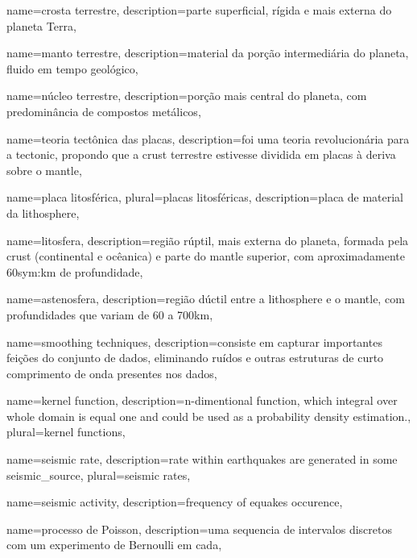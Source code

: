 {
	name={crosta terrestre},
	description={parte superficial, rígida e mais externa do planeta Terra},
}

{
	name={manto terrestre},
	description={material da por{ç}{ã}o intermediária do planeta, 
		fluido em tempo geológico},
}

{
	name={n{ú}cleo terrestre},
	description={por{ç}{ã}o mais central do planeta, com predomin{â}ncia de compostos metálicos},
}

{
	name={teoria tect{ô}nica das placas},
	description={foi uma teoria revolucionária para a \gls{tectonic},
				propondo que a \gls{crust} terrestre estivesse dividida 
				em placas {à} deriva sobre o \gls{mantle}},
}


{
	name={placa litosf{é}rica},
	plural={placas litosf{é}ricas},
	description={placa de material da \gls{lithosphere}},
}


{
	name={litosfera},
	description={região rúptil, mais externa do planeta, formada pela \gls{crust} 
		(continental e ocêanica) e parte do \gls{mantle} superior, com aproximadamente 
		60\gls*{sym:km} de profundidade},
}


{
	name={astenosfera},
	description={região dúctil entre a \gls{lithosphere} e o \gls{mantle},
				com profundidades que variam de 60 a 700km},
}

{
	name={smoothing techniques},
	description={consiste em capturar importantes feições do conjunto de dados,
				 eliminando ruídos e outras estruturas de curto comprimento de onda
				 presentes nos dados},
}

{
	name={kernel function},
	description={n-dimentional function, which integral over whole domain is equal one and could be used as a probability density estimation.},
	plural={kernel functions},
}

{
	name={seismic rate},
	description={rate within earthquakes are generated in some \gls{seismic_source}},
	plural={seismic rates},
}

{
	name={seismic activity},
	description={frequency of \glspl{equake} occurence},
}

{
	name={processo de Poisson},
	description={uma sequencia de intervalos discretos com um experimento de Bernoulli em cada},
}

